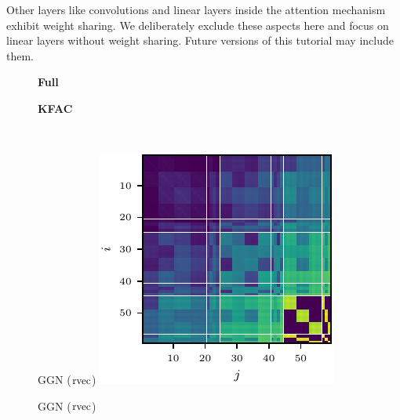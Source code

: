 Other layers like convolutions and linear layers inside the attention mechanism exhibit weight sharing.
We deliberately exclude these aspects here and focus on linear layers without weight sharing.
Future versions of this tutorial may include them.

\switchcolumn[1]
\begin{figure}[!h]
  \centering
  \begin{minipage}[t]{0.485\linewidth}
    \centering
    \textbf{Full}
  \end{minipage}
  \hfill
  \begin{minipage}[t]{0.485\linewidth}
    \centering
    \textbf{KFAC}
  \end{minipage}
  \\
  \begin{minipage}[t]{0.485\linewidth}
    \centering
    GGN ($\operatorname{rvec}$)\vspace{1ex}
    \includegraphics[width=\linewidth]{../kfs/plots/synthetic_rvec_ggn_full.pdf}
  \end{minipage}
  \hfill
  \begin{minipage}[t]{0.485\linewidth}
    \centering
    GGN ($\operatorname{rvec}$)\vspace{1ex}

\end{minipage}
\end{figure}
